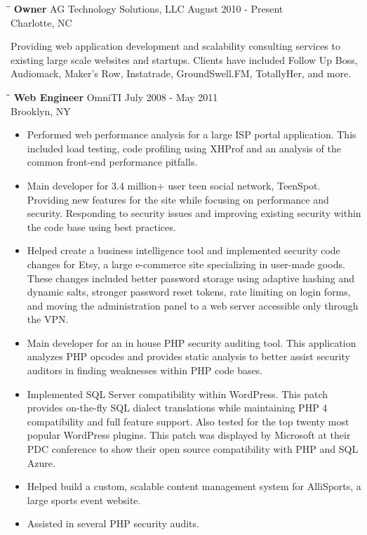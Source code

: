 \documentclass{res}
\begin{document}
\begin{resume}
   \begin{tabbing}
   \hspace{2.3in}\= \hspace{2.6in}\= \kill %
    {\bf Owner} \>AG Technology Solutions, LLC     \> August 2010 - Present\\
                             \>Charlotte, NC
   \end{tabbing}\vspace{-5pt}      %
    Providing web application development and scalability consulting services to existing large scale websites and startups. Clients have included Follow Up Boss, Audiomack, Maker's Row, Instatrade, GroundSwell.FM, TotallyHer, and more.

   \begin{tabbing}%
   \hspace{2.3in}\= \hspace{2.6in}\= \kill %
   {\bf Web Engineer}  \>OmniTI \> July 2008 - May 2011\\
                          \>Brooklyn, NY
   \end{tabbing}\vspace{-5pt}
   \begin{itemize}
    \item Performed web performance analysis for a large ISP portal application. This included load testing, code profiling using XHProf and an analysis of the common front-end performance pitfalls.
    \item Main developer for 3.4 million+ user teen social network, TeenSpot. Providing new features for the site while focusing on performance and security. Responding to security issues and improving existing security within the code base using best practices.
    \item Helped create a business intelligence tool and implemented security code changes for Etsy, a large e-commerce site specializing in user-made goods. These changes included better password storage using adaptive hashing and dynamic salts, stronger password reset tokens, rate limiting on login forms, and moving the administration panel to a web server accessible only through the VPN.
    \item Main developer for an in house PHP security auditing tool. This application analyzes PHP opcodes and provides static analysis to better assist security auditors in finding weaknesses within PHP code bases.
    \item Implemented SQL Server compatibility within WordPress. This patch provides on-the-fly SQL dialect translations while maintaining PHP 4 compatibility and full feature support. Also tested for the top twenty most popular WordPress plugins. This patch was displayed by Microsoft at their PDC conference to show their open source compatibility with PHP and SQL Azure.
    \item Helped build a custom, scalable content management system for AlliSports, a large sports event website.
    \item Assisted in several PHP security audits.
    \end{itemize}


\end{resume}
\end{document}
